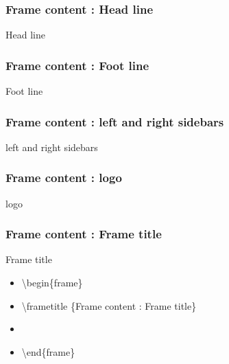 \documentclass[ aspectratio=169,  10pt,blue,xcolor=pdftex,dvipsnames,table,handout,notes]{beamer}
\begin{document}
		\begin{frame}
		\frametitle{Frame content : Head line}

			\begin{block} {Head line}
			\end{block}

		\end{frame}

		\begin{frame}
		\frametitle{Frame content : Foot line}

			\begin{block} {Foot line}
			\end{block}

		\end{frame}

		\begin{frame}
		\frametitle{Frame content : left and right sidebars}

			\begin{block} {left and right sidebars}
			\end{block}

		\end{frame}


		\begin{frame}
		\frametitle{Frame content : logo}

			\begin{block} {logo}
			\end{block}

		\end{frame}

		\begin{frame}
		\frametitle{Frame content : Frame title}

			\begin{block} {Frame title}
			\begin{itemize}
			\item[]	\textbackslash begin\{frame\}
			\item[]	\textbackslash frametitle \{Frame content : Frame title\}
			\item[]	
			\item[]	\textbackslash end\{frame\}
			\end{itemize}
			\end{block}

		\end{frame}
\end{document}
